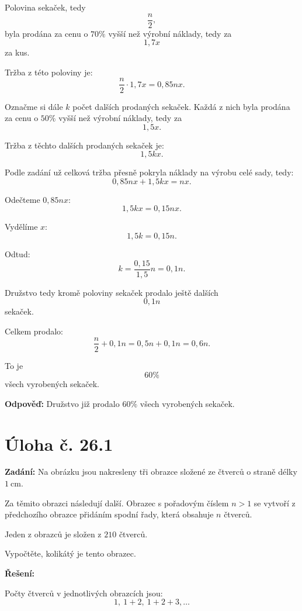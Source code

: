 \documentclass[12pt,a4paper]{article}
\begin{document}
\medskip

Polovina sekaček, tedy
\[
\frac{n}{2},
\]
byla prodána za cenu o \(70\%\) vyšší než výrobní náklady, tedy za
\[
1{,}7x
\]
za kus.

Tržba z této poloviny je:
\[
\frac{n}{2}\cdot 1{,}7x = 0{,}85nx.
\]

\medskip

Označme si dále \(k\) počet dalších prodaných sekaček.  
Každá z nich byla prodána za cenu o \(50\%\) vyšší než výrobní náklady, tedy za
\[
1{,}5x.
\]

Tržba z těchto dalších prodaných sekaček je:
\[
1{,}5kx.
\]

\medskip

Podle zadání už celková tržba přesně pokryla náklady na výrobu celé sady, tedy:
\[
0{,}85nx + 1{,}5kx = nx.
\]

Odečteme \(0{,}85nx\):
\[
1{,}5kx = 0{,}15nx.
\]

Vydělíme \(x\):
\[
1{,}5k = 0{,}15n.
\]

Odtud:
\[
k = \frac{0{,}15}{1{,}5}n = 0{,}1n.
\]

Družstvo tedy kromě poloviny sekaček prodalo ještě dalších
\[
0{,}1n
\]
sekaček.

Celkem prodalo:
\[
\frac{n}{2}+0{,}1n = 0{,}5n+0{,}1n = 0{,}6n.
\]

To je
\[
60\%
\]
všech vyrobených sekaček.

\bigskip

\textbf{Odpověď:}  
Družstvo již prodalo \(60\%\) všech vyrobených sekaček.


\newpage
\section*{Úloha č. 26.1}

\textbf{Zadání:}  
Na obrázku jsou nakresleny tři obrazce složené ze čtverců o straně délky \(1\ \mathrm{cm}\).

Za těmito obrazci následují další. Obrazec s pořadovým číslem \(n>1\) se vytvoří z předchozího obrazce přidáním spodní řady, která obsahuje \(n\) čtverců.

Jeden z obrazců je složen z \(210\) čtverců.

Vypočtěte, kolikátý je tento obrazec.

\bigskip

\textbf{Řešení:}

Počty čtverců v jednotlivých obrazcích jsou:
\[
1,\ 1+2,\ 1+2+3,\dots
\]
\end{document}
